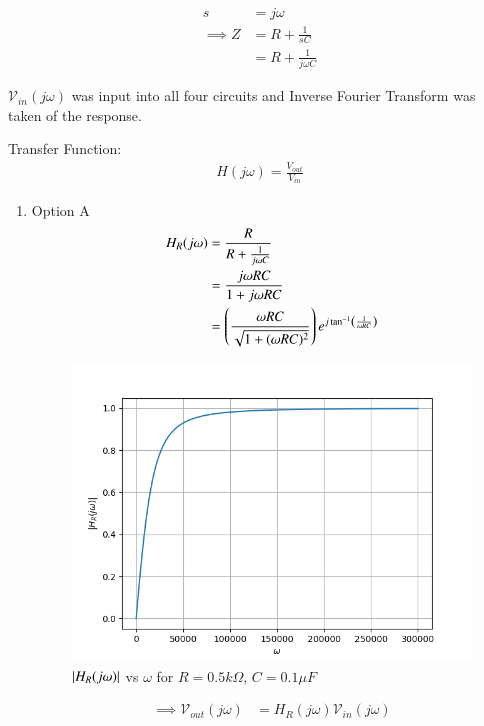 \documentclass[journal,12pt,twocolumn]{IEEEtran}
\theoremstyle{remark}
\begin{document}

\begin{align}
    s &= j\omega\\
    \implies Z &= R + \frac{1}{sC}\\
    &= R + \frac{1}{j\omega C}
\end{align}

$\mathcal{V}_{in}(j\omega)$ was input into all four circuits and Inverse Fourier Transform was taken of the response.

Transfer Function:
\begin{align}
    H(j\omega) = \frac{V_{out}}{V_{in}}
\end{align}
\begin{enumerate}
    \item Option A
    \begin{align}
        H_R(j\omega) &=  \frac{R}{R + \frac{1}{j\omega C}}\\
        &= \frac{j\omega RC}{1+j\omega RC}\\
        &= \left(\frac{\omega R C}{\sqrt{1 + (\omega R C)^2}}\right)e^{j\tan^{-1}\left(\frac{1}{\omega RC}\right)}
    \end{align}
    \begin{figure}[!h]
        \centering
        \includegraphics[width=\columnwidth]{figs/opt_a_hf.png}
        \caption{$\left\vert H_R(j\omega)\right\vert$ vs $\omega$ for $R=0.5k\Omega$, $C=0.1\mu F$}
        \label{fig:opt_a_hf_gate.ph.23.37}
    \end{figure}
    \begin{align}
        \implies \mathcal{V}_{out}(j\omega) &= H_R(j\omega)\mathcal{V}_{in}(j\omega)\\

\end{align}
\end{enumerate}
\end{document}
